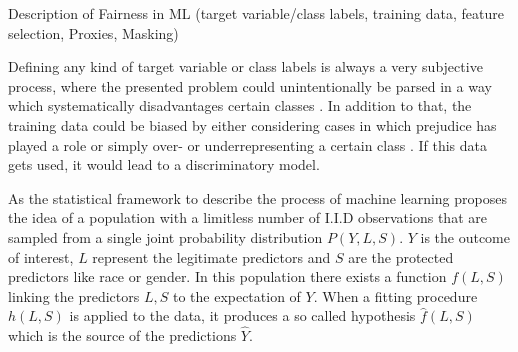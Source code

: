 \label{sec:introduction}

Description of Fairness in ML (target variable/class labels, training data, feature selection, 
Proxies, Masking)

Defining any kind of target variable or class labels is always a very subjective process, where 
the presented problem could unintentionally be parsed in a way which systematically disadvantages 
certain classes \cite{Barocas.2016}. In addition to that, the training data could be biased by 
either considering cases in which prejudice has played a role or simply over- or underrepresenting 
a certain class \cite{Barocas.2016}. If this data gets used, it would lead to a discriminatory model. 

As the statistical framework to describe the process of machine learning \cite{Berk.2018} proposes the idea 
of a population with a limitless number of I.I.D observations that are sampled from a single joint probability 
distribution $P(Y,L,S)$. 
$Y$ is the outcome of interest, $L$ represent the legitimate predictors and $S$ are the protected predictors 
like race or gender. In this population there exists a function $f(L,S)$ linking the predictors $L,S$ to the 
expectation of $Y$. When a fitting procedure $h(L,S)$ is applied to the data, it produces a so called hypothesis
$\hat{f}(L,S)$ which is the source of the predictions $\hat{Y}$. 
